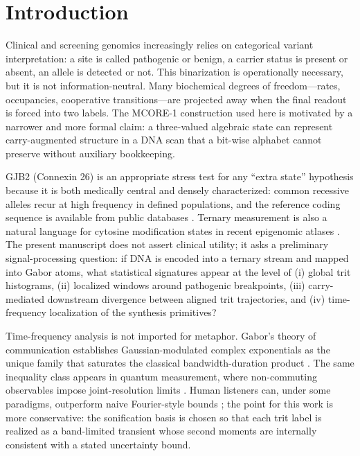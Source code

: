 \documentclass[preprint,12pt]{elsarticle}
\begin{document}
\section{Introduction}

Clinical and screening genomics increasingly relies on categorical variant interpretation: a site is called pathogenic or benign, a carrier status is present or absent, an allele is detected or not. This binarization is operationally necessary, but it is not information-neutral. Many biochemical degrees of freedom---rates, occupancies, cooperative transitions---are projected away when the final readout is forced into two labels. The MCORE-1 construction used here is motivated by a narrower and more formal claim: a three-valued algebraic state can represent carry-augmented structure in a DNA scan that a bit-wise alphabet cannot preserve without auxiliary bookkeeping.

GJB2 (Connexin 26) is an appropriate stress test for any ``extra state'' hypothesis because it is both medically central and densely characterized: common recessive alleles recur at high frequency in defined populations, and the reference coding sequence is available from public databases \citep{beach2020gjb2,mese2007gap,ncbi_nm004004}. Ternary measurement is also a natural language for cytosine modification states in recent epigenomic atlases \citep{goldberg2025ternary}. The present manuscript does not assert clinical utility; it asks a preliminary signal-processing question: if DNA is encoded into a ternary stream and mapped into Gabor atoms, what statistical signatures appear at the level of (i) global trit histograms, (ii) localized windows around pathogenic breakpoints, (iii) carry-mediated downstream divergence between aligned trit trajectories, and (iv) time-frequency localization of the synthesis primitives?

Time-frequency analysis is not imported for metaphor. Gabor's theory of communication establishes Gaussian-modulated complex exponentials as the unique family that saturates the classical bandwidth-duration product \citep{gabor1946theory}. The same inequality class appears in quantum measurement, where non-commuting observables impose joint-resolution limits \citep{heisenberg1927anschaulichen}. Human listeners can, under some paradigms, outperform naive Fourier-style bounds \citep{oppenheim2013human}; the point for this work is more conservative: the sonification basis is chosen so that each trit label is realized as a band-limited transient whose second moments are internally consistent with a stated uncertainty bound.
\end{document}
